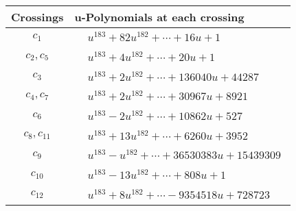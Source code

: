 \documentclass[1p]{elsarticle_modified}
\theoremstyle{definition}
\begin{document}
\begin{tabular}{m{50pt}|m{274pt}}
Crossings & \hspace{64pt}u-Polynomials at each crossing \\
\hline $$\begin{aligned}c_{1}\end{aligned}$$&$\begin{aligned}
&u^{183}+82 u^{182}+\cdots+16 u+1
\end{aligned}$\\
\hline $$\begin{aligned}c_{2},c_{5}\end{aligned}$$&$\begin{aligned}
&u^{183}+4 u^{182}+\cdots+20 u+1
\end{aligned}$\\
\hline $$\begin{aligned}c_{3}\end{aligned}$$&$\begin{aligned}
&u^{183}+2 u^{182}+\cdots+136040 u+44287
\end{aligned}$\\
\hline $$\begin{aligned}c_{4},c_{7}\end{aligned}$$&$\begin{aligned}
&u^{183}+2 u^{182}+\cdots+30967 u+8921
\end{aligned}$\\
\hline $$\begin{aligned}c_{6}\end{aligned}$$&$\begin{aligned}
&u^{183}-2 u^{182}+\cdots+10862 u+527
\end{aligned}$\\
\hline $$\begin{aligned}c_{8},c_{11}\end{aligned}$$&$\begin{aligned}
&u^{183}+13 u^{182}+\cdots+6260 u+3952
\end{aligned}$\\
\hline $$\begin{aligned}c_{9}\end{aligned}$$&$\begin{aligned}
&u^{183}- u^{182}+\cdots+36530383 u+15439309
\end{aligned}$\\
\hline $$\begin{aligned}c_{10}\end{aligned}$$&$\begin{aligned}
&u^{183}-13 u^{182}+\cdots+808 u+1
\end{aligned}$\\
\hline $$\begin{aligned}c_{12}\end{aligned}$$&$\begin{aligned}
&u^{183}+8 u^{182}+\cdots-9354518 u+728723
\end{aligned}$\\
\hline
\end{tabular}\\~\\
\end{document}
